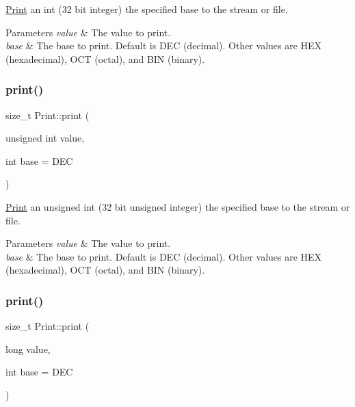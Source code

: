 \mbox{\hyperlink{class_print}{Print}} an int (32 bit integer) the specified base to the stream or file. 


\begin{DoxyParams}{Parameters}
{\em value} & The value to print. \\
\hline
{\em base} & The base to print. Default is D\+EC (decimal). Other values are H\+EX (hexadecimal), O\+CT (octal), and B\+IN (binary). \\
\hline
\end{DoxyParams}
\mbox{\label{class_print_afcd7d3a184df961a502643e4fb638c52}} 
\subsubsection{\texorpdfstring{print()}{print()}\hspace{0.1cm}{\footnotesize\ttfamily [3/6]}}
{\footnotesize\ttfamily size\+\_\+t Print\+::print (\begin{DoxyParamCaption}\item[{unsigned int}]{value,  }\item[{int}]{base = {\ttfamily DEC} }\end{DoxyParamCaption})}



\mbox{\hyperlink{class_print}{Print}} an unsigned int (32 bit unsigned integer) the specified base to the stream or file. 


\begin{DoxyParams}{Parameters}
{\em value} & The value to print. \\
\hline
{\em base} & The base to print. Default is D\+EC (decimal). Other values are H\+EX (hexadecimal), O\+CT (octal), and B\+IN (binary). \\
\hline
\end{DoxyParams}
\mbox{\label{class_print_a0c663ac015ebc037ea044ba2e2cf2947}} 
\subsubsection{\texorpdfstring{print()}{print()}\hspace{0.1cm}{\footnotesize\ttfamily [4/6]}}
{\footnotesize\ttfamily size\+\_\+t Print\+::print (\begin{DoxyParamCaption}\item[{long}]{value,  }\item[{int}]{base = {\ttfamily DEC} }\end{DoxyParamCaption})}




